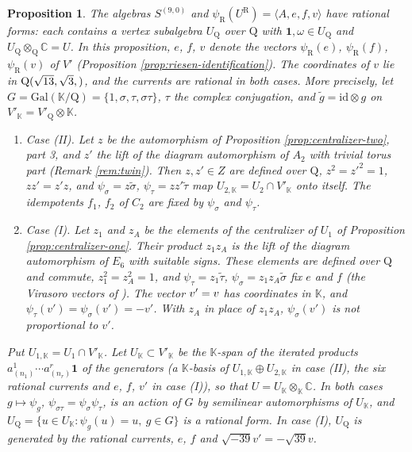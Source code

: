\documentclass[leqno]{article}
\newcommand{\Cbb}{\ensuremath{\mathbb{C}}}
\newcommand{\K}{\ensuremath{\mathbb{K}}}
\newcommand{\Q}{\mathrm{Q}}
\newcommand{\la}{\langle}
\newcommand{\ra}{\rangle}
\newcommand{\ot}{\otimes}
\let\i\relax
\newcommand{\i}{\mathrm{i}}
\newtheorem{prop}[thm]{Proposition}
\numberwithin{equation}{section}
\begin{document}
\begin{prop}
\label{prop:rational-forms}
The algebras $S^{(9,0)}$ and $\psi_{\mathrm R}(U^{\mathrm R}) = \la A,e,f,v\ra$ have rational forms: each contains a vertex subalgebra $U_\Q$ over $\Q$ with $\mathbf 1, \omega \in U_\Q$ and $U_\Q \ot_\Q \Cbb = U$. In this proposition, $e$, $f$, $v$ denote the vectors $\psi_{\mathrm R}(e)$, $\psi_{\mathrm R}(f)$, $\psi_{\mathrm R}(v)$ of $V'$ (Proposition \ref{prop:riesen-identification}). The coordinates of $v$ lie in $\Q(\sqrt{13},\sqrt 3,\i)$, and the currents are rational in both cases. More precisely, let $G = \mathrm{Gal}(\K/\Q) = \{1,\sigma,\tau,\sigma\tau\}$, $\tau$ the complex conjugation, and $\tilde g = \mathrm{id} \ot g$ on $V'_\K = V'_\Q \ot \K$.
\begin{enumerate}
\item Case (II). Let $z$ be the automorphism of Proposition \ref{prop:centralizer-two}, part 3, and $z'$ the lift of the diagram automorphism of $A_2$ with trivial torus part (Remark \ref{rem:twin}). Then $z, z' \in Z$ are defined over $\Q$, $z^2 = z'^2 = 1$, $zz' = z'z$, and $\psi_\sigma = z\tilde\sigma$, $\psi_\tau = zz'\tilde\tau$ map $U_{2,\K} = U_2 \cap V'_\K$ onto itself. The idempotents $f_1$, $f_2$ of $C_2$ are fixed by $\psi_\sigma$ and $\psi_\tau$.
\item Case (I). Let $z_1$ and $z_A$ be the elements of the centralizer of $U_1$ of Proposition \ref{prop:centralizer-one}. Their product $z_1z_A$ is the lift of the diagram automorphism of $E_6$ with suitable signs. These elements are defined over $\Q$ and commute, $z_1^2 = z_A^2 = 1$, and $\psi_\tau = z_1\tilde\tau$, $\psi_\sigma = z_1z_A\tilde\sigma$ fix $e$ and $f$ (the Virasoro vectors of \cite{Rie26}). The vector $v' = \i v$ has coordinates in $\K$, and $\psi_\tau(v') = \psi_\sigma(v') = -v'$. With $z_A$ in place of $z_1z_A$, $\psi_\sigma(v')$ is not proportional to $v'$.
\end{enumerate}
Put $U_{1,\K} = U_1 \cap V'_\K$. Let $U_\K \subset V'_\K$ be the $\K$-span of the iterated products $a^1_{(n_1)}\cdots a^r_{(n_r)}\mathbf 1$ of the generators (a $\K$-basis of $U_{1,\K} \oplus U_{2,\K}$ in case (II), the six rational currents and $e$, $f$, $v'$ in case (I)), so that $U = U_\K \ot_\K \Cbb$. In both cases $g \mapsto \psi_g$, $\psi_{\sigma\tau} = \psi_\sigma\psi_\tau$, is an action of $G$ by semilinear automorphisms of $U_\K$, and $U_\Q = \{u \in U_\K : \psi_g(u) = u,\ g \in G\}$ is a rational form. In case (I), $U_\Q$ is generated by the rational currents, $e$, $f$ and $\sqrt{-39} v' = -\sqrt{39} v$.
\end{prop}
\end{document}
